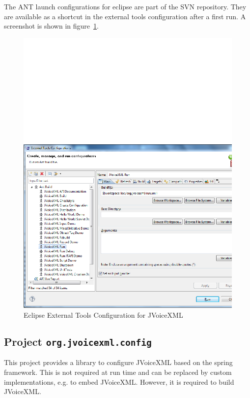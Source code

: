 \documentclass[11pt,a4paper]{article}
\begin{document}
The ANT launch configurations for eclipse are part of the SVN repository. They
are available as a shortcut in the external tools configuration after a first
run. A screenshot is shown in figure~\ref{fig:eclipse-launch}.
\begin{figure}
\includegraphics[width=\linewidth]{eclipse-launch.png}
\caption{Eclipse External Tools Configuration for JVoiceXML}
\label{fig:eclipse-launch}
\end{figure}


\subsection{Project \texttt{org.jvoicexml.config}}
\label{sec:org.jvoicexml.config}

This project provides a library to configure JVoiceXML based on the spring
framework.
This is not required at run time and can be replaced by custom
implementations, e.g. to embed JVoiceXML. However, it is required to build
JVoiceXML.
\end{document}
